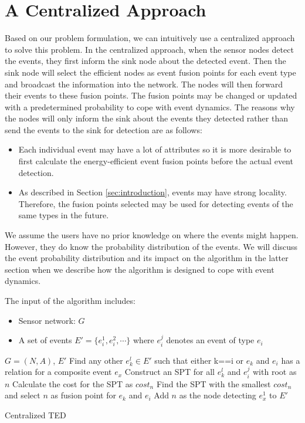 \section{A Centralized Approach}
\label{sec:centralized}
Based on our problem formulation, we can intuitively use a centralized approach to solve this problem. In the centralized approach, when the sensor nodes detect the events, they first inform the sink node about the detected event. Then the sink node will select the efficient nodes as event fusion points for each event type and broadcast the information into the network. The nodes will then forward their events to these fusion points. The fusion points may be changed or updated with a predetermined probability to cope with event dynamics. The reasons why the nodes will only inform the sink about the events they detected rather than send the events to the sink for detection are as follows:
\begin{itemize}
\item Each individual event may have a lot of attributes so it is more desirable to first calculate the energy-efficient event fusion points before the actual event detection.
\item As described in Section \ref{sec:introduction}, events may have strong locality. Therefore, the fusion points selected may be used for detecting events of the same types in the future.
\end{itemize}

We assume the users have no prior knowledge on where the events might happen. However, they do know the probability distribution of the events. We will discuss the event probability distribution and its impact on the algorithm in the latter section when we describe how the algorithm is designed to cope with event dynamics.

The input of the algorithm includes:
\begin{itemize}
\item Sensor network: \(G\)
\item A set of events \(E'=\{e_i^1, e_i^2, \cdots \}\) where \(e_i^j\) denotes an event of type \(e_i\)
\end{itemize}

\begin{algorithm}
\begin{algorithmic}[1]
\REQUIRE \(G=(N,A)\), \(E'\)
			\STATE Find any other \(e_k^l\in E'\) such that either k==i or \(e_k\) and \(e_i\) has a relation for a composite event \(e_x\)
				\STATE Construct an SPT for all \(e_k^l\) and \(e_i^j\) with root as \(n\)
				\STATE Calculate the cost for the SPT as \(cost_n\)
			\ENDFOR
			\STATE Find the SPT with the smallest \(cost_n\) and select \(n\) as fusion point for \(e_k\) and \(e_i\)
			\STATE Add \(n\) as the node detecting \(e_x^1\) to \(E'\)
		\ENDIF
	\ENDFOR
\end{algorithmic}
\caption{Centralized TED}
\label{algo:centralizedTED}
\end{algorithm}

